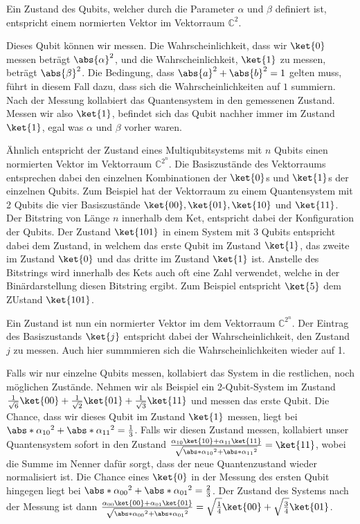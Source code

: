 Ein Zustand des Qubits, welcher durch die Parameter $\alpha$ und $\beta$ definiert ist, entspricht einem normierten Vektor im Vektorraum $\mathbb{C}^2$.

Dieses Qubit können wir messen. Die Wahrscheinlichkeit, dass wir $\ket{0}$ messen beträgt $\abs{\alpha}^2$, und die Wahrscheinlichkeit, $\ket{1}$ zu messen, beträgt $\abs{\beta}^2$. Die Bedingung, dass $\abs{a}^2 + \abs{b}^2 = 1$ gelten muss, führt in diesem Fall dazu, dass sich die Wahrscheinlichkeiten auf $1$ summiern. Nach der Messung kollabiert das Quantensystem in den gemessenen Zustand. Messen wir also $\ket{1}$, befindet sich das Qubit nachher immer im Zustand $\ket{1}$, egal was $\alpha$ und $\beta$ vorher waren.

Ähnlich entspricht der Zustand eines Multiqubitsystems mit $n$ Qubits einen normierten Vektor im Vektorraum $\mathbb{C}^{2^n}$. Die Basiszustände des Vektorraums entsprechen dabei den einzelnen Kombinationen der $\ket{0}$s und $\ket{1}$s der einzelnen Qubits. Zum Beispiel hat der Vektorraum zu einem Quantensystem mit 2 Qubits die vier Basiszustände $\ket{00}, \ket{01}, \ket{10}$ und $\ket{11}$. Der Bitstring von Länge $n$ innerhalb dem Ket, entspricht dabei der Konfiguration der Qubits. Der Zustand $\ket{101}$ in einem System mit 3 Qubits entspricht dabei dem Zustand, in welchem das erste Qubit im Zustand $\ket{1}$, das zweite im Zustand $\ket{0}$ und das dritte im Zustand $\ket{1}$ ist. Anstelle des Bitstrings wird innerhalb des Kets auch oft eine Zahl verwendet, welche in der Binärdarstellung diesen Bitstring ergibt. Zum Beispiel entspricht $\ket{5}$ dem ZUstand $\ket{101}$.

Ein Zustand ist nun ein normierter Vektor im dem Vektorraum $\mathbb{C}^{2^n}$. Der Eintrag des Basiszustands $\ket{j}$ entspricht dabei der Wahrscheinlichkeit, den Zustand $j$ zu messen. Auch hier summmieren sich die Wahrscheinlichkeiten wieder auf 1.

Falls wir nur einzelne Qubits messen, kollabiert das System in die restlichen, noch möglichen Zustände. Nehmen wir als Beispiel ein 2-Qubit-System im Zustand $\frac{1}{\sqrt{6}}\ket{00} + \frac{1}{\sqrt{2}}\ket{01} + \frac{1}{\sqrt{3}}\ket{11}$ und messen das erste Qubit. Die Chance, dass wir dieses Qubit im Zustand $\ket{1}$ messen, liegt bei $\abs*{\alpha_{10}}^2 + \abs*{\alpha_{11}}^2 = \frac{1}{3}$. Falls wir diesen Zustand messen, kollabiert unser Quantensystem sofort in den Zustand $\frac{\alpha_{10}\ket{10} + \alpha_{11}\ket{11}}{\sqrt{\abs*{\alpha_{10}}^2 + \abs*{\alpha_{11}}^2}} = \ket{11}$, wobei die Summe im Nenner dafür sorgt, dass der neue Quantenzustand wieder normalisiert ist. Die Chance eines $\ket{0}$ in der Messung des ersten Qubit hingegen liegt bei $\abs*{\alpha_{00}}^2 + \abs*{\alpha_{01}}^2 = \frac{2}{3}$. Der Zustand des Systems nach der Messung ist dann $\frac{\alpha_{00}\ket{00} + \alpha_{01}\ket{01}}{\sqrt{\abs*{\alpha_{00}}^2 + \abs*{\alpha_{01}}^2}} = \sqrt{\frac{1}{4}}\ket{00} + \sqrt{\frac{3}{4}}\ket{01}$.

